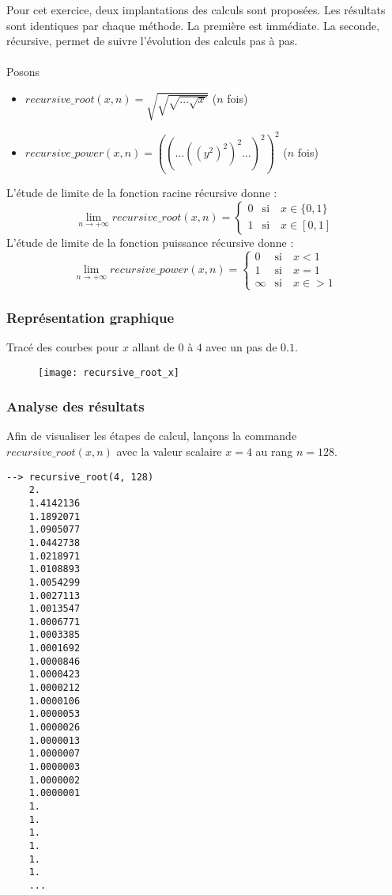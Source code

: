 \documentclass[a4paper,12pt]{article}
\begin{document}
Pour cet exercice, deux implantations des calculs sont proposées. Les résultats sont identiques par chaque méthode. La première est immédiate. La seconde, récursive, permet de suivre l'évolution des calculs pas à pas.\\\\
Posons
\begin{itemize}
  \item $recursive\_root(x, n) = \sqrt{\sqrt{\sqrt {\dots{\sqrt{ x}}}}}$ ($n$ fois)
  \item $recursive\_power(x, n) = ((\dots((y^2)^2)^2\dots)^2)^2$ ($n$ fois)
\end{itemize}
L'étude de limite de la fonction racine récursive donne :
$$
\lim\limits_{n \to +\infty} recursive\_root(x, n) = \left\{
    \begin{array}{ll}
        0 & \text{si} \quad x \in \{0, 1\} \\
        1 & \text{si} \quad x \in [0, 1]
    \end{array}
\right.
$$
L'étude de limite de la fonction puissance récursive donne :
$$
\lim\limits_{n \to +\infty} recursive\_power(x, n) = \left\{
    \begin{array}{ll}
        0 & \text{si} \quad x < 1 \\
        1 & \text{si} \quad x = 1 \\
        \infty & \text{si} \quad x \in > 1
    \end{array}
\right.
$$

\subsubsection{Représentation graphique}
Tracé des courbes pour $x$ allant de $0$ à $4$ avec un pas de $0.1$.

\begin{figure}[h]
    \centering
    \texttt{[image: recursive\_root\_x]}
\end{figure}

\subsubsection{Analyse des résultats}

Afin de visualiser les étapes de calcul, lançons la commande $recursive\_root(x, n)$ avec la valeur scalaire $x = 4$ au rang $n = 128$.

\begin{verbatim}
--> recursive_root(4, 128)
    2.  
    1.4142136  
    1.1892071  
    1.0905077  
    1.0442738  
    1.0218971  
    1.0108893  
    1.0054299  
    1.0027113  
    1.0013547  
    1.0006771  
    1.0003385  
    1.0001692  
    1.0000846  
    1.0000423  
    1.0000212  
    1.0000106  
    1.0000053  
    1.0000026  
    1.0000013  
    1.0000007  
    1.0000003  
    1.0000002  
    1.0000001  
    1.  
    1.  
    1.  
    1.  
    1.  
    1.  
    ...
\end{verbatim}
\end{document}
